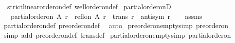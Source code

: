 \begin{isabellebody}
\ \ strict{\isacharunderscore}{\kern0pt}linear{\isacharunderscore}{\kern0pt}order{\isacharunderscore}{\kern0pt}on{\isacharunderscore}{\kern0pt}def\ well{\isacharunderscore}{\kern0pt}order{\isacharunderscore}{\kern0pt}on{\isacharunderscore}{\kern0pt}def\isanewline
\isanewline
{}\isamarkupfalse%
\ partial{\isacharunderscore}{\kern0pt}order{\isacharunderscore}{\kern0pt}onD{\isacharcolon}{\kern0pt}\isanewline
\ \ \ {\isachardoublequoteopen}partial{\isacharunderscore}{\kern0pt}order{\isacharunderscore}{\kern0pt}on\ A\ r{\isachardoublequoteclose}\ \ {\isachardoublequoteopen}refl{\isacharunderscore}{\kern0pt}on\ A\ r{\isachardoublequoteclose}\ \ {\isachardoublequoteopen}trans\ r{\isachardoublequoteclose}\ \ {\isachardoublequoteopen}antisym\ r{\isachardoublequoteclose}\isanewline
%
\isadelimproof
\ \ %
\endisadelimproof
%
\isatagproof
{}\isamarkupfalse%
\ assms\ \isamarkupfalse%
\ partial{\isacharunderscore}{\kern0pt}order{\isacharunderscore}{\kern0pt}on{\isacharunderscore}{\kern0pt}def\ preorder{\isacharunderscore}{\kern0pt}on{\isacharunderscore}{\kern0pt}def\ \isamarkupfalse%
\ auto%
\endisatagproof
{\isafoldproof}%
%
\isadelimproof
\isanewline
%
\endisadelimproof
\isanewline
{}\isamarkupfalse%
\ preorder{\isacharunderscore}{\kern0pt}on{\isacharunderscore}{\kern0pt}empty{\isacharbrackleft}{\kern0pt}simp{\isacharbrackright}{\kern0pt}{\isacharcolon}{\kern0pt}\ {\isachardoublequoteopen}preorder{\isacharunderscore}{\kern0pt}on\ {\isacharbraceleft}{\kern0pt}{\isacharbraceright}{\kern0pt}\ {\isacharbraceleft}{\kern0pt}{\isacharbraceright}{\kern0pt}{\isachardoublequoteclose}\isanewline
%
\isadelimproof
\ \ %
\endisadelimproof
%
\isatagproof
{}\isamarkupfalse%
\ {\isacharparenleft}{\kern0pt}simp\ add{\isacharcolon}{\kern0pt}\ preorder{\isacharunderscore}{\kern0pt}on{\isacharunderscore}{\kern0pt}def\ trans{\isacharunderscore}{\kern0pt}def{\isacharparenright}{\kern0pt}%
\endisatagproof
{\isafoldproof}%
%
\isadelimproof
\isanewline
%
\endisadelimproof
\isanewline
{}\isamarkupfalse%
\ partial{\isacharunderscore}{\kern0pt}order{\isacharunderscore}{\kern0pt}on{\isacharunderscore}{\kern0pt}empty{\isacharbrackleft}{\kern0pt}simp{\isacharbrackright}{\kern0pt}{\isacharcolon}{\kern0pt}\ {\isachardoublequoteopen}partial{\isacharunderscore}{\kern0pt}order{\isacharunderscore}{\kern0pt}on\ {\isacharbraceleft}{\kern0pt}{\isacharbraceright}{\kern0pt}\ {\isacharbraceleft}{\kern0pt}{\isacharbraceright}{\kern0pt}{\isachardoublequoteclose}\isanewline

\end{isabellebody}
